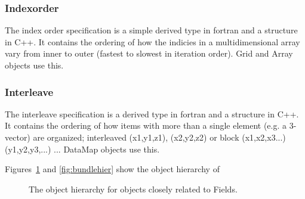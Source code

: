 \subsubsection{Indexorder}

The index order specification is 
a simple derived type in fortran and a structure in C++.
It contains the ordering of how the indicies in a multidimensional
array vary from inner to outer (fastest to slowest in iteration
order).  Grid and Array objects use this.

\subsubsection{Interleave}

The interleave specification is a 
derived type in fortran and a structure in C++.
It contains the ordering of how items with more than
a single element (e.g. a 3-vector) are organized; 
interleaved (x1,y1,z1), (x2,y2,z2) or 
block (x1,x2,x3...) (y1,y2,y3,...) ...
DataMap objects use this.


Figures~\ref{fig:fieldhier} and \ref{fig:bundlehier} show the object hierarchy of

\begin{figure}
\caption[Field hierarchy]{The object hierarchy for objects closely related to Fields.}
\label{fig:fieldhier}
\end{figure}

